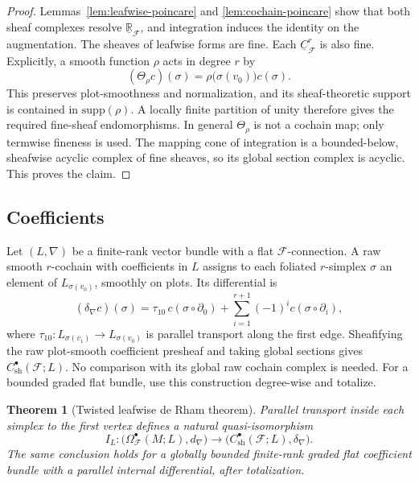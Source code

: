 \documentclass[12pt]{amsart}
\newtheorem{thm}{Theorem}[section]
\theoremstyle{definition}
\theoremstyle{remark}
\numberwithin{equation}{section}
\newcommand{\supp}{\mbox{supp}}
\newcommand{\CF}{{\mathcal F}}
\newcommand{\R}{{\mathbb{R}}}
\newcommand{\1}{{\mathbb{1}}}
\begin{document}
\begin{proof}
Lemmas~\ref{lem:leafwise-poincare} and
\ref{lem:cochain-poincare} show that both sheaf complexes resolve
$\underline{\R}_{\CF}$, and integration induces the identity on the
augmentation.  The sheaves of leafwise forms are fine.  Each
$\underline C^r_{\CF}$ is also fine.  Explicitly, a smooth function
$\rho$ acts in degree $r$ by
\[
 (\Theta_\rho c)(\sigma)
 =\rho\bigl(\sigma(v_0)\bigr)c(\sigma).
\]
This preserves plot-smoothness and normalization, and its
sheaf-theoretic support is contained in $\supp(\rho)$.  A locally
finite partition of unity therefore gives the required fine-sheaf
endomorphisms.  In general $\Theta_\rho$ is not a cochain map; only
termwise fineness is used.  The mapping cone of integration is a
bounded-below, sheafwise acyclic complex of fine sheaves, so its global
section complex is acyclic.  This proves the claim.
\end{proof}

\subsection{Coefficients}

Let $(L,\nabla)$ be a finite-rank vector bundle with a flat
$\CF$-connection.  A raw smooth $r$-cochain with coefficients in $L$
assigns to each foliated $r$-simplex $\sigma$ an element of
$L_{\sigma(v_0)}$, smoothly on plots.  Its differential is
\[
 (\delta_\nabla c)(\sigma)
 =
 \tau_{10}\,c(\sigma\circ\partial_0)
 +\sum_{i=1}^{r+1}(-1)^i c(\sigma\circ\partial_i),
\]
where $\tau_{10}:L_{\sigma(v_1)}\to L_{\sigma(v_0)}$ is parallel
transport along the first edge.  Sheafifying the raw plot-smooth
coefficient presheaf and taking global sections gives
$C^\bullet_{\mathrm{sh}}(\CF;L)$.  No comparison with its global raw
cochain complex is needed.  For a bounded graded flat bundle, use this
construction degree-wise and totalize.

\begin{thm}[Twisted leafwise de Rham theorem]\label{thm:twisted-dr}
Parallel transport inside each simplex to the first vertex defines a
natural quasi-isomorphism
\[
 I_L:
 \bigl(\Omega^\bullet_{\CF}(M;L),d_\nabla\bigr)
 \longrightarrow
 \bigl(C^\bullet_{\mathrm{sh}}(\CF;L),\delta_\nabla\bigr).
\]
The same conclusion holds for a globally bounded finite-rank graded
flat coefficient bundle with a parallel internal differential, after
totalization.
\end{thm}
\end{document}
